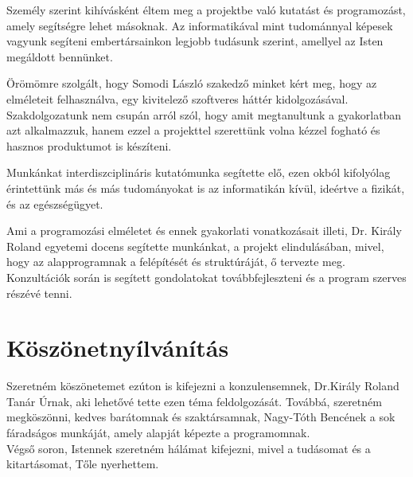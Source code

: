 \documentclass[tocnopagenum]{thesis-ekf}
\theoremstyle{definition}
\theoremstyle{remark}
\begin{document}
	Személy szerint kihívásként éltem meg a projektbe való kutatást és programozást, amely segítségre lehet másoknak. Az informatikával mint tudománnyal képesek vagyunk segíteni embertársainkon legjobb tudásunk szerint, amellyel az Isten megáldott bennünket.
	
	Örömömre szolgált, hogy Somodi László szakedző minket kért meg, hogy az elméleteit felhasználva, egy kivitelező szoftveres háttér kidolgozásával. Szakdolgozatunk nem csupán arról szól, hogy amit megtanultunk a gyakorlatban azt alkalmazzuk, hanem ezzel a projekttel szerettünk volna kézzel fogható és hasznos produktumot is készíteni.
	
	Munkánkat interdiszciplináris kutatómunka segítette elő, ezen okból kifolyólag érintettünk más és más tudományokat is az informatikán kívül, ideértve a fizikát, és az egészségügyet.
	
	Ami a programozási elméletet és ennek gyakorlati vonatkozásait illeti, Dr. Király Roland  egyetemi docens segítette munkánkat, a projekt elindulásában, mivel, hogy az alapprogramnak a felépítését és struktúráját, ő tervezte meg. Konzultációk során is segített gondolatokat továbbfejleszteni és a program szerves részévé tenni.

	\chapter*{Köszönetnyílvánítás}
	Szeretném köszönetemet ezúton is kifejezni a konzulensemnek, Dr.Király Roland Tanár Úrnak, aki lehetővé tette ezen téma feldolgozását.
	Továbbá, szeretném megköszönni, kedves barátomnak és szaktársamnak, Nagy-Tóth Bencének a sok fáradságos munkáját, amely alapját képezte a programomnak. 
	\\
	Végső soron, Istennek szeretném hálámat kifejezni, mivel a tudásomat és a kitartásomat, Tőle nyerhettem. 
	
\end{document}

